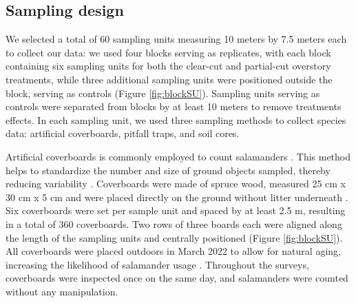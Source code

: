 \subsection*{Sampling design}
\label{subsec:sampling}


We selected a total of 60 sampling units measuring 10 meters by 7.5 meters each to collect our data: we used four blocks serving as replicates, 
with each block containing six sampling units for both the clear-cut and partial-cut overstory treatments, 
while three additional sampling units were positioned outside the block, serving as controls (Figure \ref*{fig:blockSU}).
Sampling units serving as controls were separated from blocks by at least 10 meters to remove treatments effects.
In each sampling unit, we used three sampling methods to collect species data: artificial coverboards, pitfall traps, and soil cores. 

Artificial coverboards is commonly employed to count salamanders \citep{hesedUncoveringSalamanderEcology2012,mazerolleWoodlandSalamanderPopulation2021a,mooreComparisonPopulationEastern2009c}. 
This method helps to standardize the number and size of ground objects sampled, thereby reducing variability \citep{hydeSamplingPlethodontidSalamanders2001}. 
Coverboards were made of spruce wood, measured 25 cm x 30 cm x 5 cm and were placed directly on the ground without litter underneath \citep{mazerolleWoodlandSalamanderPopulation2021a}. 
Six coverboards were set per sample unit and spaced by at least 2.5 m, resulting in a total of 360 coverboards.
Two rows of three boards each were aligned along the length of the sampling units and centrally positioned (Figure \ref{fig:blockSU}).
All coverboards were placed outdoors in March 2022 to allow for natural aging, increasing the likelihood of salamander usage \citep{hedrickEffectsCoverboardAge2021,smithEffectsCoverBoard2014a}.
Throughout the surveys, coverboards were inspected once on the same day, and salamanders were counted without any manipulation.

